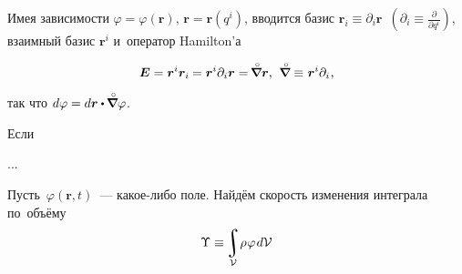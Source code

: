 

\label{para:differentiation}

\begin{otherlanguage}{russian}

Имея зависимости ${\varphi \!=\! \varphi(\bm{r})}$, ${\bm{r} \!=\! \bm{r}(q^{i})}$, вводится базис ${\bm{r}_i \equiv \partial_i \bm{r}}$~${(\partial_i \equiv \frac{\partial}{\partial q^i})}$, взаимный базис ${\bm{r}^i}$ и~оператор Hamilton’а

\nopagebreak\vspace{-0.4em}\begin{equation}
\bm{E} = \bm{r}^i \bm{r}_i \hspace{-0.1ex} = \bm{r}^i \partial_i \bm{r} = \hspace{-0.25ex} \boldnablacircled \bm{r} , \:\,
\boldnablacircled \equiv \hspace{.1ex} \bm{r}^i \partial_i \hspace{.1ex} ,
\end{equation}

\vspace{-0.2em}\noindent так что ${d\varphi = d\bm{r} \dotp \hspace{-0.1ex} \boldnablacircled \varphi}$.

Если

...



Пусть~${\varphi(\bm{r},t)}$~--- какое\hbox{-}либо поле. Найдём скорость изменения интеграла по~объёму
\[ \Upsilon \equiv \hspace{-0.2ex} \integral\displaylimits_{\mathcal{V}} \! \rho \hspace{0.1ex} \varphi \hspace{0.2ex} d\mathcal{V} \]


\end{otherlanguage}
